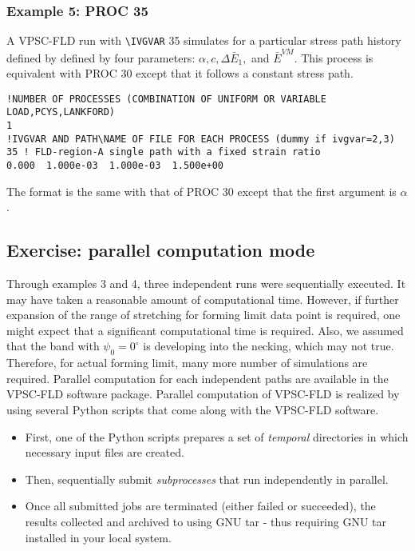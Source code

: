 \documentclass[12pt]{amsart}
\begin{document}
\newpage
\subsubsection{Example 5: PROC 35}
A VPSC-FLD run with \verb$\IVGVAR$ 35 simulates for a particular stress path history defined by defined by four parameters: $\alpha, c, \Delta{\bar{E}_1},$ and $\bar{E}^{VM}$.
This process is equivalent with PROC 30 except that it follows a constant stress path.
\begin{lstlisting}[style=inp, caption=A portion of the input file vpsc7.in for stress ratio controlled FLD, label={code:vpscin1}]
!NUMBER OF PROCESSES (COMBINATION OF UNIFORM OR VARIABLE LOAD,PCYS,LANKFORD)
1
!IVGVAR AND PATH\NAME OF FILE FOR EACH PROCESS (dummy if ivgvar=2,3)
35 ! FLD-region-A single path with a fixed strain ratio
0.000  1.000e-03  1.000e-03  1.500e+00
\end{lstlisting}
The format is the same with that of PROC 30 except that the first argument is $\alpha$.

\newpage
\subsection{Exercise: parallel computation mode}
\label{sec:paral_mode}
Through examples 3 and 4, three independent runs were sequentially executed.
It may have taken a reasonable amount of computational time.
However, if further expansion of the range of stretching for forming limit data point is required, one might expect that a significant computational time is required.
Also, we assumed that the band with $\psi_0=0^\circ{}$ is developing into the necking, which may not true.
Therefore, for actual forming limit, many more number of simulations are required.
Parallel computation for each independent paths are available in the VPSC-FLD software package.
Parallel computation of VPSC-FLD is realized by using several Python scripts that come along with the VPSC-FLD software.
\begin{itemize}[\itshape i\upshape.]
\item First, one of the Python scripts prepares a set of \emph{temporal} directories in which necessary input files are created.
\item Then, sequentially submit \emph{subprocesses} that run independently in parallel.
\item Once all submitted jobs are terminated (either failed or succeeded), the results collected and archived to using GNU tar - thus requiring GNU tar installed in your local system.
\end{itemize}
\end{document}
